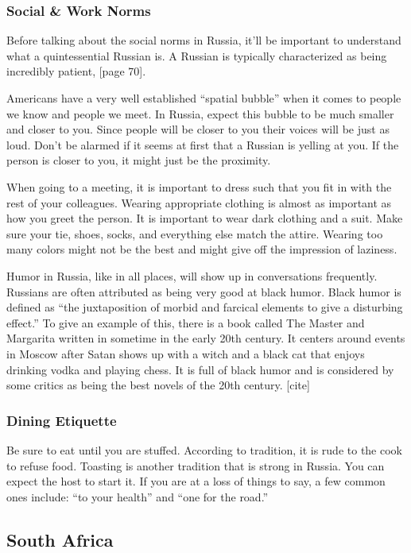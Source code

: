 \documentclass[11pt,a4paper,oneside]{report}
\begin{document}
\subsubsection{Social \& Work Norms}\label{third}

Before talking about the social norms in Russia, it’ll be important to
understand what a quintessential Russian is. A Russian is typically
characterized as being incredibly patient, [page 70].

Americans have a very well established “spatial bubble” when it comes to people
we know and people we meet. In Russia, expect this bubble to be much smaller
and closer to you. Since people will be closer to you their voices will be just
as loud. Don’t be alarmed if it seems at first that a Russian is yelling at
you. If the person is closer to you, it might just be the proximity.

When going to a meeting,  it is important to dress such that you fit in with
the rest of your colleagues. Wearing appropriate clothing is almost as
important as how you greet the person. It is important to wear dark clothing
and a suit. Make sure your tie, shoes, socks, and everything else match the
attire. Wearing too many colors might not be the best and might give off the
impression of laziness.

Humor in Russia, like in all places, will show up in conversations frequently.
Russians are often attributed as being very good at black humor. Black humor is
defined as “the juxtaposition of morbid and farcical elements to give a
disturbing effect.” To give an example of this, there is a book called The
Master and Margarita written in sometime in the early 20th century. It centers
around events in Moscow after Satan shows up with a witch and a black cat that
enjoys drinking vodka and playing chess. It is full of black humor and is
considered by some critics as being the best novels of the 20th century. [cite]

\subsubsection{Dining Etiquette}\label{third}

Be sure to eat until you are stuffed. According to tradition, it is rude to the
cook to refuse food. Toasting is another tradition that is strong in Russia.
You can expect the host to start it. If you are at a loss of things to say, a
few common ones include: “to your health” and “one for the road.”

\subsection{South Africa}\label{second}
\end{document}
